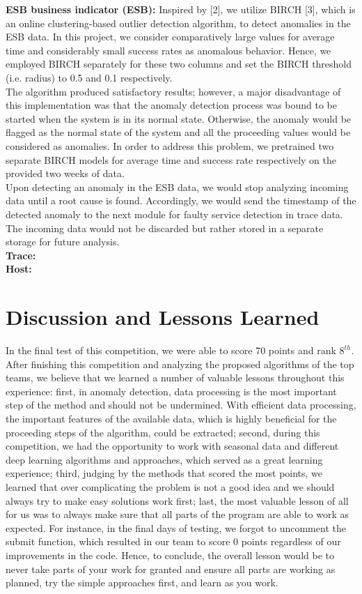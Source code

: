 \documentclass[12pt]{article}
\begin{document}
\smallskip\smallskip
\noindent \textbf{ESB business indicator (ESB): }Inspired by [2], we utilize BIRCH [3], which is an online clustering-based outlier detection algorithm, to detect anomalies in the ESB data. In this project, we consider comparatively large values for average time and considerably small success rates as anomalous behavior. Hence, we employed BIRCH separately for these two columns and set the BIRCH threshold (i.e. radius) to 0.5 and 0.1 respectively. \\ The algorithm produced satisfactory results; however, a major disadvantage of this implementation was that the anomaly detection process was bound to be started when the system is in its normal state. Otherwise, the anomaly would be flagged as the normal state of the system and all the proceeding values would be considered as anomalies. In order to address this problem, we pretrained two separate BIRCH models for average time and success rate respectively on the provided two weeks of data. \\
Upon detecting an anomaly in the ESB data, we would stop analyzing incoming data until a root cause is found. Accordingly, we would send the timestamp of the detected anomaly to the next module for faulty service detection in trace data. The incoming data would not be discarded but rather stored in a separate storage for future analysis.
\\
\smallskip\smallskip
\noindent \textbf{Trace: }
\\
\smallskip\smallskip
\noindent \textbf{Host: }
\\
\section{Discussion and Lessons Learned}
In the final test of this competition, we were able to score 70 points and rank $8^{th}$. After finishing this competition and analyzing the proposed algorithms of the top teams, we believe that we learned a number of valuable lessons throughout this experience: first, in anomaly detection, data processing is the most important step of the method and should not be undermined. With efficient data processing, the important features of the available data, which is highly beneficial for the proceeding steps of the algorithm, could be extracted; second, during this competition, we had the opportunity to work with seasonal data and different deep learning algorithms and approaches, which served as a great learning experience; third, judging by the methods that scored the most points, we learned that over complicating the problem is not a good idea and we should always try to make easy solutions work first; last, the most valuable lesson of all for us was to always make sure that all parts of the program are able to work as expected. For instance, in the final days of testing, we forgot to uncomment the submit function, which resulted in our team to score 0 points regardless of our improvements in the code. Hence, to conclude, the overall lesson would be to never take parts of your work for granted and ensure all parts are working as planned, try the simple approaches first, and learn as you work. 
\end{document}
